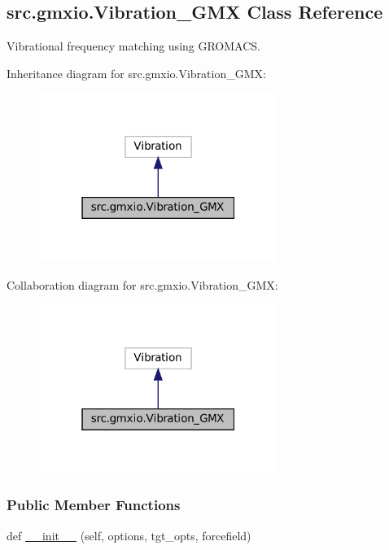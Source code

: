 \hypertarget{classsrc_1_1gmxio_1_1Vibration__GMX}{}\subsection{src.\+gmxio.\+Vibration\+\_\+\+G\+MX Class Reference}
\label{classsrc_1_1gmxio_1_1Vibration__GMX}


Vibrational frequency matching using G\+R\+O\+M\+A\+CS.  




Inheritance diagram for src.\+gmxio.\+Vibration\+\_\+\+G\+MX\+:
\nopagebreak
\begin{figure}[H]
\begin{center}
\leavevmode
\includegraphics[width=220pt]{classsrc_1_1gmxio_1_1Vibration__GMX__inherit__graph}
\end{center}
\end{figure}


Collaboration diagram for src.\+gmxio.\+Vibration\+\_\+\+G\+MX\+:
\nopagebreak
\begin{figure}[H]
\begin{center}
\leavevmode
\includegraphics[width=220pt]{classsrc_1_1gmxio_1_1Vibration__GMX__coll__graph}
\end{center}
\end{figure}
\subsubsection*{Public Member Functions}
\begin{DoxyCompactItemize}
\item 
def \hyperlink{classsrc_1_1gmxio_1_1Vibration__GMX_af2ed8380679b143d304e4b17f048f9e0}{\+\_\+\+\_\+init\+\_\+\+\_\+} (self, options, tgt\+\_\+opts, forcefield)
\end{DoxyCompactItemize}
